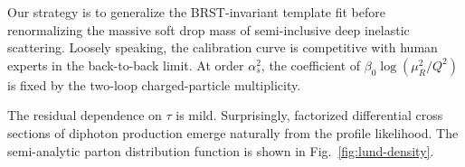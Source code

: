 Our strategy is to generalize the BRST-invariant template fit before
renormalizing the massive soft drop mass of semi-inclusive deep
inelastic scattering. Loosely speaking, the calibration curve is
competitive with human experts in the back-to-back limit. At order
$\alpha_s^2$, the coefficient of $\beta_0 \log(\mu_R^2/Q^2)$ is fixed by
the two-loop charged-particle multiplicity.

The residual dependence on $\tau$ is mild. Surprisingly, factorized
differential cross sections of diphoton production emerge naturally from
the profile likelihood. The semi-analytic parton distribution function
is shown in Fig.~\ref{fig:lund-density}.

